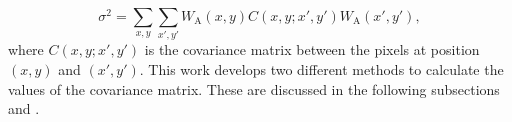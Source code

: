 \begin{equation}\label{eq: variance}
    \sigma^2 = \sum_{x,y}\sum_{x',y'}W_\mathrm{A}(x,y)C(x,y;x',y')W_\mathrm{A}(x',y'),
\end{equation}
where $C(x,y;x',y')$ is the covariance matrix between the pixels at position $(x,y)$ and $(x',y')$. This work develops two different methods to calculate the values of the covariance matrix. These are discussed in the following subsections  and .







